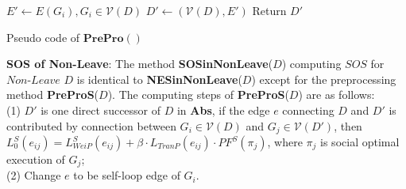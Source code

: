 \documentclass{acm_proc_article-sp}
\begin{document}
\begin{algorithm}[!h]
\scriptsize
 $E'\leftarrow E(G_{\textit{i}}),G_{\textit{i}}\in \mathcal{\mathcal{V}}(D)$\;
 $D'\leftarrow (\mathcal{V}(D), E')$\;
 Return $D'$\;
 \caption{Pseudo code of $\mathbf{PrePro}()$}
 \label{preprocess}
\end{algorithm}
\textbf{SOS of Non-Leave}: The method \textbf{SOSinNonLeave}($D$) computing $\textit{SOS}$ for $\textit{Non-Leave}$ $D$ is identical to \textbf{NESinNonLeave}($D$) except for the preprocessing method \textbf{PreProS}($D$). The computing steps of \textbf{PreProS}($D$) are as follows: \\
(1) $D'$ is one direct successor of $D$ in \textbf{Abs}, if the edge $e$ connecting $D$ and $D'$ is contributed by connection between $G_{\textit{i}}\in \mathcal{V}(D)$ and $G_{\textit{j}}\in \mathcal{V}(D')$, then $L_{0}^S(e_{\textit{ij}})=L_{\textit{WeiP}}^{S}(e_{ij})+\beta\cdot L_{\textit{TranP}}(e_{\textit{ij}})\cdot PF^{S}(\pi_{\textit{j}})$, where $\pi_{\textit{j}}$ is social optimal execution of $G_{\textit{j}}$;\\
(2) Change $e$ to be self-loop edge of $G_{\textit{i}}$.
\end{document}
